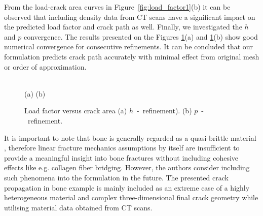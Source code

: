 \documentclass[onecolumn]{svjour3}
\begin{document}
From the load-crack area curves in Figure~\ref{fig:load_factor1}(b) it can be observed that including density data from CT scans have a significant impact on the predicted load factor and crack path as well. 
% 
% 
Finally, we investigated the $h$ and $p$ convergence. The results presented on the Figures \ref{fig:load_factor2}(a) and \ref{fig:load_factor2}(b) show good numerical convergence for consecutive refinements. It can be concluded that our formulation predicts crack path accurately with minimal effect from original mesh or order of approximation. 
% 
\begin{figure}[h]
	\centering
	\begin{minipage}{.45\textwidth}
	\end{minipage}%
	\begin{minipage}{.45\textwidth}
	\end{minipage} \\
	(a)\hspace{5cm} (b)
			 \caption{Load factor versus crack area (a) $h$~-~refinement). (b) $p$~-~refinement.}
		 \label{fig:load_factor2}
	\end{figure}
% 
% 
It is important to note that bone is generally regarded as a quasi-brittle material \cite{gasser2007numerical}, therefore linear fracture mechanics assumptions by itself are insufficient to provide a meaningful insight into bone fractures without including cohesive effects like e.g. collagen fiber bridging. However, the authors consider including such phenomena into the formulation in the future. The presented crack propagation in bone example is mainly included as an extreme case of a highly heterogeneous material and complex three-dimensional final crack geometry while utilising material data obtained from CT scans.
% 
\end{document}
